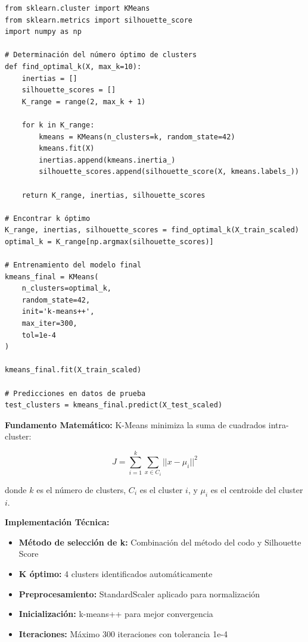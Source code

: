 \documentclass[12pt,letterpaper]{article}
\begin{document}
\begin{verbatim}
from sklearn.cluster import KMeans
from sklearn.metrics import silhouette_score
import numpy as np

# Determinación del número óptimo de clusters
def find_optimal_k(X, max_k=10):
    inertias = []
    silhouette_scores = []
    K_range = range(2, max_k + 1)
    
    for k in K_range:
        kmeans = KMeans(n_clusters=k, random_state=42)
        kmeans.fit(X)
        inertias.append(kmeans.inertia_)
        silhouette_scores.append(silhouette_score(X, kmeans.labels_))
    
    return K_range, inertias, silhouette_scores

# Encontrar k óptimo
K_range, inertias, silhouette_scores = find_optimal_k(X_train_scaled)
optimal_k = K_range[np.argmax(silhouette_scores)]

# Entrenamiento del modelo final
kmeans_final = KMeans(
    n_clusters=optimal_k,
    random_state=42,
    init='k-means++',
    max_iter=300,
    tol=1e-4
)

kmeans_final.fit(X_train_scaled)

# Predicciones en datos de prueba
test_clusters = kmeans_final.predict(X_test_scaled)
\end{verbatim}

\textbf{Fundamento Matemático:}
K-Means minimiza la suma de cuadrados intra-cluster:

\begin{equation}
J = \sum_{i=1}^{k} \sum_{x \in C_i} ||x - \mu_i||^2
\end{equation}

donde $k$ es el número de clusters, $C_i$ es el cluster $i$, y $\mu_i$ es el centroide del cluster $i$.

\textbf{Implementación Técnica:}
\begin{itemize}
    \item \textbf{Método de selección de k:} Combinación del método del codo y Silhouette Score
    \item \textbf{K óptimo:} 4 clusters identificados automáticamente
    \item \textbf{Preprocesamiento:} StandardScaler aplicado para normalización
    \item \textbf{Inicialización:} k-means++ para mejor convergencia
    \item \textbf{Iteraciones:} Máximo 300 iteraciones con tolerancia 1e-4
\end{itemize}
\end{document}
